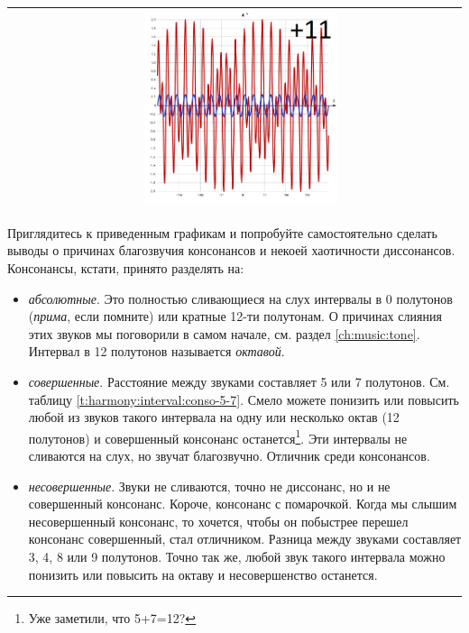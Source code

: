 \begin{table}[!ht]
\begin{tabular}{c|c}
            & \includegraphics[width=0.45\textwidth]{fig/intervals/i11} \\
        \hline\hline
    \end{tabular}
\end{table}

Приглядитесь к приведенным графикам и попробуйте самостоятельно сделать выводы о причинах благозвучия консонансов и некоей хаотичности диссонансов. Консонансы, кстати, принято разделять на:
\begin{itemize}
    \item \emph{абсолютные}. Это полностью сливающиеся на слух интервалы в 0 полутонов (\emph{прима}, если помните) или кратные 12-ти полутонам. О причинах слияния этих звуков мы поговорили в самом начале, см. раздел \ref{ch:music:tone}. Интервал в 12 полутонов называется \emph{октавой}.
    
    \item \emph{совершенные}. Расстояние между звуками составляет 5 или 7 полутонов. См. таблицу \ref{t:harmony:interval:conso-5-7}. Смело можете понизить или повысить любой из звуков такого интервала на одну или несколько октав (12 полутонов) и совершенный консонанс останется\footnote{Уже заметили, что 5+7=12?}. Эти интервалы не сливаются на слух, но звучат благозвучно. Отличник среди консонансов.
    
    \item \emph{несовершенные}. Звуки не сливаются, точно не диссонанс, но и не совершенный консонанс. Короче, консонанс с помарочкой. Когда мы слышим несовершенный консонанс, то хочется, чтобы он побыстрее перешел консонанс совершенный, стал отличником. Разница между звуками составляет 3, 4, 8 или 9 полутонов. Точно так же, любой звук такого интервала можно понизить или повысить на октаву и несовершенство останется.
\end{itemize}


